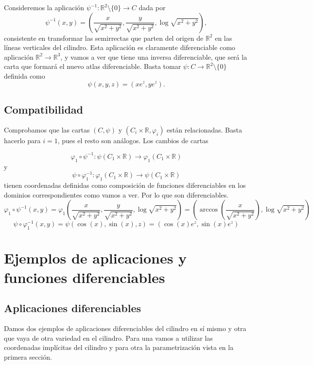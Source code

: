 \documentclass[twoside, 11pt]{article}
\theoremstyle{definition}
\newcommand{\R}{\mathbb{R}}
\begin{document}
Consideremos la aplicación $\psi^{-1}:\R^2 \setminus\{0\}\to C$ dada por $$\psi^{-1}(x,y)=\left(\frac{x}{\sqrt{x^2+y^2}},\frac{y}{\sqrt{x^2+y^2}}, \log\sqrt{x^2+y^2} \right),$$ consistente en transformar las semirrectas que parten del origen de $\R^2$ en las líneas verticales del cilindro. Esta aplicación es claramente diferenciable como aplicación $\R^2\to\R^3$, y vamos a ver que tiene una inversa diferenciable, que será la carta que formará el nuevo atlas diferenciable. Basta tomar $\psi:C\to\R^2\setminus\{0\}$ definida como $$\psi(x,y,z)=(xe^z,ye^z).$$ 

\subsection{Compatibilidad}

Comprobamos que las cartas $(C, \psi)$ y $(C_i\times\R, \varphi_i)$ están relacionadas. Basta hacerlo para $i=1$, pues el resto son análogos. Los cambios de cartas

\[
\varphi_1\circ \psi^{-1}: \psi(C_1\times\R)\to \varphi_1(C_1\times\R)
\]
y 
\[
\psi\circ\varphi_1^{-1} : \varphi_1(C_1\times\R)\to \psi(C_1\times\R)
\]
tienen coordenadas definidas como composición de funciones diferenciables en los dominios correspondientes como vamos a ver. Por lo que son diferenciables. 
\[
\varphi_1\circ \psi^{-1}(x,y)=\varphi_1\left(\frac{x}{\sqrt{x^2+y^2}},\frac{y}{\sqrt{x^2+y^2}}, \log\sqrt{x^2+y^2} \right)=\left(\arccos\left(\frac{x}{\sqrt{x^2+y^2}}\right),  \log\sqrt{x^2+y^2} \right)
\]
\[
\psi\circ\varphi_1^{-1}(x,y)=\psi(\cos(x),\sin(x),z)=(\cos(x)e^z,\sin(x)e^z)
\]

\section{Ejemplos de aplicaciones y funciones diferenciables}

\subsection{Aplicaciones diferenciables}
Damos dos ejemplos de aplicaciones diferenciables del cilindro en sí mismo y otra que vaya de otra variedad en el cilindro. Para una vamos a utilizar las coordenadas implícitas del cilindro y para otra la parametrización vista en la primera sección. 
\end{document}
